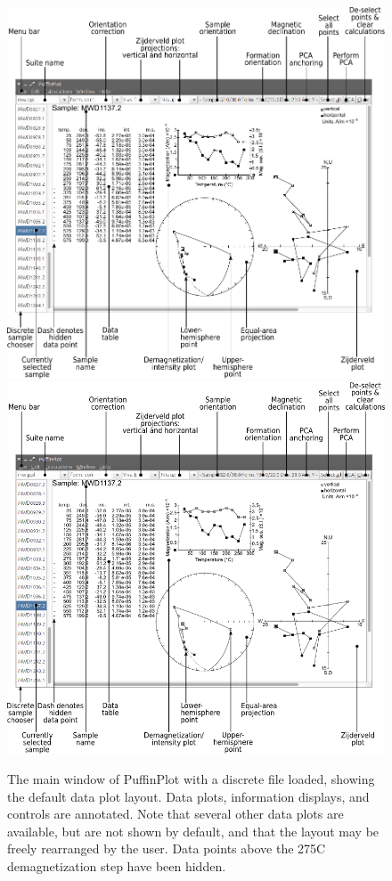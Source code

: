 \documentclass[a4paper,british]{article}
\begin{document}
\begin{figure}[htbp]
\centering
\ifpdf\includegraphics{figures/annot-scrnshot.pdf}
\else\includegraphics{figures/annot-scrnshot.png}
\fi
\caption{\label{fig:screenshot}The main window of PuffinPlot with a discrete
  file loaded, showing the default data plot layout. Data plots, information
  displays, and controls are annotated. Note that several other data plots
  are available, but are not shown by default, and that the layout may be
  freely rearranged by the user. Data points above the 275\textdegree C
  demagnetization step have been hidden.}
\end{figure}
\end{document}
